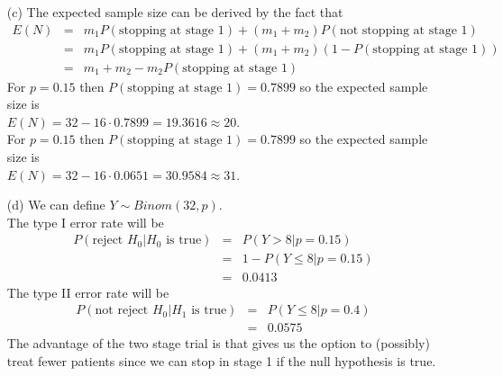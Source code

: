 \documentclass[11pt,a4paper]{article}
\begin{document}
\begin{enumerate}
 
\item[(c)] The expected sample size can be derived by the fact that 
\begin{eqnarray*}
E(N)&=&m_1 P(\text{stopping at stage 1})+(m_1+m_2)P(\text{not stopping at stage 1})\\
&=& m_1 P(\text{stopping at stage 1})+(m_1+m_2)(1-P(\text{stopping at stage 1}))\\
&=& m_1+m_2-m_2P(\text{stopping at stage 1})
\end{eqnarray*}
For $p=0.15$ then $P(\text{stopping at stage 1})=0.7899$ 
so the expected sample size is\\ $E(N)=32-16\cdot 0.7899=19.3616\approx 20$.\\
For $p=0.15$ then $P(\text{stopping at stage 1})=0.7899$ 
so the expected sample size is\\ $E(N)=32-16\cdot 0.0651=30.9584\approx 31$.\\
\item[(d)] We can define $Y\sim Binom (32,p)$.\\
The type I error rate will be 
\begin{eqnarray*}
P(\text{reject }H_0|H_0 \text{ is true})&=& P(Y>8|p=0.15)\\
&=& 1-P(Y\leq 8|p=0.15) \\
&=& 0.0413
\end{eqnarray*}
The type II error rate will be 
\begin{eqnarray*}
P(\text{not reject }H_0|H_1 \text{ is true})&=& P(Y\leq 8|p=0.4)\\
&=& 0.0575
\end{eqnarray*}
The advantage of the two stage trial is that gives us the option to (possibly) treat fewer patients since we can stop in stage 1 if the null hypothesis is true.  
\end{enumerate}
\end{document}

